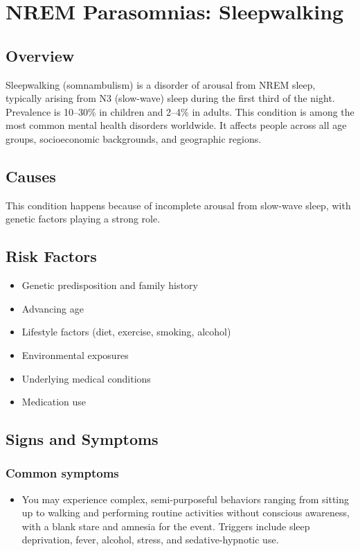 \chapter{NREM Parasomnias: Sleepwalking}
\label{sec:Sleepwalking}

\section{Overview}
Sleepwalking (somnambulism) is a disorder of arousal from NREM sleep, typically arising from N3 (slow-wave) sleep during the first third of the night. Prevalence is 10--30\% in children and 2--4\% in adults. This condition is among the most common mental health disorders worldwide. It affects people across all age groups, socioeconomic backgrounds, and geographic regions.
\section{Causes}
This condition happens because of incomplete arousal from slow-wave sleep, with genetic factors playing a strong role.     
\section{Risk Factors}

\begin{itemize}[noitemsep]
  \item Genetic predisposition and family history
  \item Advancing age
  \item Lifestyle factors (diet, exercise, smoking, alcohol)
  \item Environmental exposures
  \item Underlying medical conditions
  \item Medication use
\end{itemize}
\section{Signs and Symptoms}

\subsection{Common symptoms}
\begin{itemize}[noitemsep]
  \item You may experience complex, semi-purposeful behaviors ranging from sitting up to walking and performing routine activities without conscious awareness, with a blank stare and amnesia for the event. Triggers include sleep deprivation, fever, alcohol, stress, and sedative-hypnotic use. 
  \end{itemize}

